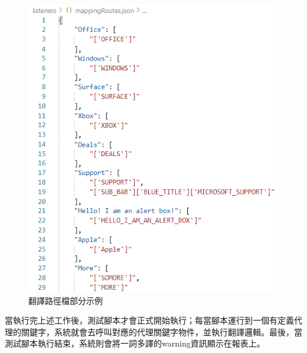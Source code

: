\begin{figure}[H]
    \centering
    \includegraphics[width= .7\textwidth]{../論文截圖/3-1-3-3 翻譯路徑檔.png}
    \caption{翻譯路徑檔部分示例}
    \label{翻譯路徑檔}
\end{figure}
當執行完上述工作後，測試腳本才會正式開始執行；每當腳本運行到一個有定義代理的關鍵字，系統就會去呼叫對應的代理關鍵字物件，並執行翻譯邏輯。最後，當測試腳本執行結束，系統則會將一詞多譯的warning資訊顯示在報表上。
